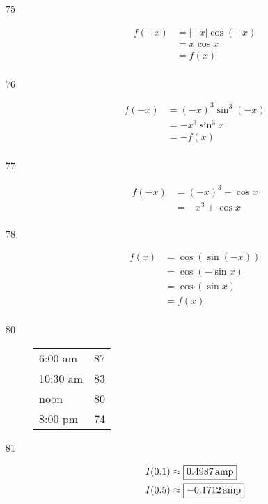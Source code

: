 \documentclass{exam}
\begin{document}
\begin{description}

      \item[75]
        \begin{align*}
          f(-x) & = | -x | \cos (-x) \\
                & = x \cos x \\
                & = f(x) \\
        \end{align*}

      \item[76]
        \begin{align*}
          f(-x) & = (-x)^3 \sin^3 (-x) \\
                & = - x^3 \sin^3 x \\
                & = - f(x) \\
        \end{align*}

      \item[77]
        \begin{align*}
          f(-x) & = (-x)^3 + \cos x \\
                & = - x^3 + \cos x \\
        \end{align*}

      \item[78]
        \begin{align*}
          f(x) & = \cos (\sin (-x)) \\
               & = \cos (- \sin x) \\
               & = \cos (\sin x) \\
               & = f(x) \\
        \end{align*}

      \item[80]
        \begin{tabular}[H]{lr}
          \toprule
          6:00 am  & 87 \\
          10:30 am & 83 \\
          noon     & 80 \\
          8:00 pm  & 74 \\
          \bottomrule
        \end{tabular}

      \item[81]
        \begin{align*}
          I(0.1) & \approx \boxed{ \unit[0.4987]{amp} } \\
          I(0.5) & \approx \boxed{ \unit[-0.1712]{amp} } \\
        \end{align*}
    \end{description}
\end{document}
